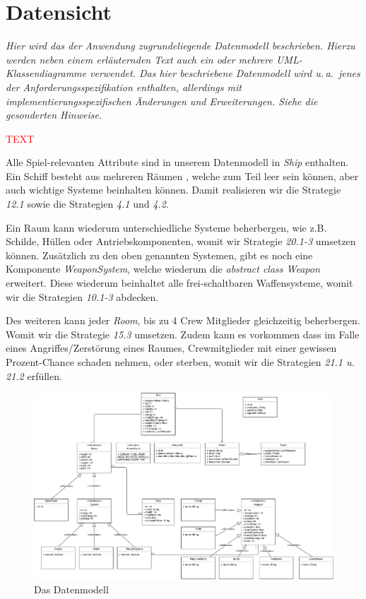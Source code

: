 \documentclass[fontsize=12pt,paper=a4,twoside]{scrartcl}
\begin{document}
\section{Datensicht} \label{sec:datensicht}

{\itshape Hier wird das der Anwendung zugrundeliegende Datenmodell beschrieben. 
Hierzu werden neben einem erläuternden Text auch ein oder mehrere 
{UML}-Klassendiagramme verwendet. Das hier beschriebene Datenmodell wird u.\,a.\ 
jenes der Anforderungsspezifikation enthalten, allerdings mit 
implementierungsspezifischen Änderungen und Erweiterungen. Siehe die gesonderten
Hinweise.}

\textcolor{red}{TEXT}

Alle Spiel-relevanten Attribute sind in unserem Datenmodell in \textit{Ship} enthalten. Ein Schiff besteht aus mehreren Räumen , welche zum Teil leer sein können, aber auch wichtige Systeme beinhalten können. Damit realisieren wir die Strategie \textit{12.1} sowie die Strategien \textit{4.1} und \textit{4.2}.

Ein Raum kann wiederum unterschiedliche Systeme beherbergen, wie z.B. Schilde, Hüllen oder Antriebskomponenten, womit wir Strategie \textit{20.1-3} umsetzen können. Zusätzlich zu den oben genannten Systemen, gibt es noch eine Komponente \textit{WeaponSystem}, welche wiederum die \textit{abstract class Weapon} erweitert. Diese wiederum beinhaltet alle frei-schaltbaren Waffensysteme, womit wir die Strategien \textit{10.1-3} abdecken.

Des weiteren kann jeder \textit{Room}, bis zu 4 Crew Mitglieder gleichzeitig beherbergen. Womit wir die Strategie \textit{15.3} umsetzen. Zudem kann es vorkommen dass im Falle eines Angriffes/Zerstörung eines Raumes, Crewmitglieder mit einer gewissen Prozent-Chance schaden nehmen, oder sterben, womit wir die Strategien \textit{21.1 u. 21.2} erfüllen.

\begin{figure}[H]
\begin{center}
  \includegraphics[width=\linewidth]{UML/Datenmodell.pdf}
    \caption{Das Datenmodell}
\end{center}
\end{figure}
\end{document}
